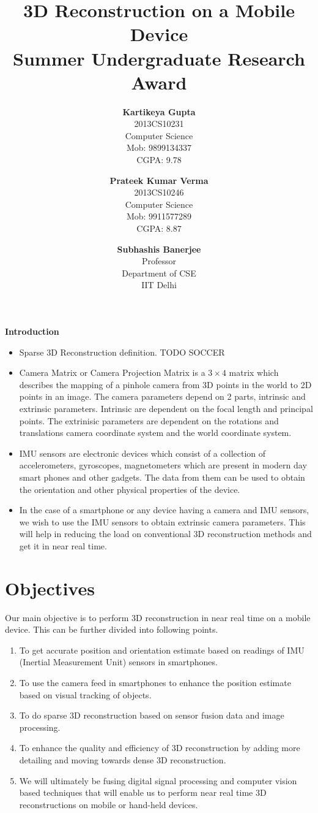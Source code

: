 \documentclass{article}
\title{\vspace*{\fill} \textbf{3D Reconstruction on a Mobile Device}
	  \\ {\large \textbf{Summer Undergraduate Research Award}}}
\author{
	\textbf{Kartikeya Gupta}\\ 
	2013CS10231\\
	Computer Science\\
	Mob: 9899134337\\
	CGPA: 9.78
	\and
	\textbf{Prateek Kumar Verma}\\ 
	2013CS10246\\
	Computer Science\\
	Mob: 9911577289\\
	CGPA: 8.87
}
\date{\textbf{Subhashis Banerjee} \\ Professor \\ Department of CSE \\ IIT Delhi \vspace*{\fill}}
\begin{document}
	\maketitle

	\newpage

	\textbf{\Large Introduction \\}
		\begin{itemize}
			\item 
				Sparse 3D Reconstruction definition. TODO SOCCER
			
			\item 
				Camera Matrix or Camera Projection Matrix is a $3 \times 4$ matrix which describes the mapping of a pinhole camera from 3D points in the world to 2D points in an image. The camera parameters depend on 2 parts, intrinsic and extrinsic parameters. Intrinsic are dependent on the focal length and principal points. The extrinisic parameters are dependent on the rotations and translations camera coordinate system and the world coordinate system.

			\item
				IMU sensors are electronic devices which consist of a collection of accelerometers, gyroscopes, magnetometers which are present in modern day smart phones and other gadgets. The data from them can be used to obtain the orientation and other physical properties of the device.

			\item 
				In the case of a smartphone or any device having a camera and IMU sensors, we wish to use  the IMU sensors to obtain extrinsic camera parameters. This will help in reducing the load on conventional 3D reconstruction methods and get it in near real time.
		\end{itemize}

	\section{Objectives} 
		Our main objective is to perform 3D reconstruction in near real time on a mobile device. This can be further divided into following points.
		\begin{enumerate}
			\item 
				To get accurate position and orientation estimate based on readings of IMU (Inertial Measurement Unit) sensors in smartphones. 
			\item
				To use the camera feed in smartphones to enhance the position estimate based on visual tracking of objects.
			\item 
				To do sparse 3D reconstruction based on sensor fusion data and image processing.
			\item
				To enhance the quality and efficiency of 3D reconstruction by adding more detailing and moving towards dense 3D reconstruction.
			\item
				We will ultimately be fusing digital signal processing and computer vision based techniques that will enable us to perform near real time 3D reconstructions on mobile or hand-held devices.
		\end{enumerate}
\end{document}
